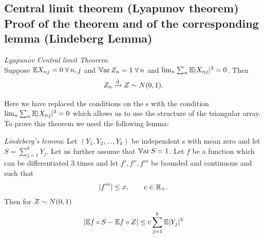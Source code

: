 \documentclass{report}
\begin{document}
\subsection{Central limit theorem (Lyapunov theorem) Proof of the theorem and of the corresponding lemma (Lindeberg Lemma)}
\begin{theorem}
	\emph{Lyapunov Central limit Theorem}:\\
	Suppose $\mathbb{E} X_{nj}=0\;\forall\, n,j$ and $\mathbb{V}\mathrm{ar}\, Z_{n}=1\;\forall\, n$ and $\lim_{n}\sum_n\mathbb{E}|X_{nj}|^{3}=0$. Then
	\[Z_{n}\xrightarrow[]{\text{d}} Z\sim N(0,1).\]
\end{theorem}
Here we have replaced the conditions on the \rv s with the condition $\lim_{n}\sum_n\mathbb{E}|X_{nj}|^{3}=0$ which allows us to use the structure of the triangular array. To prove this theorem we need the following lemma:
\begin{lemma}
	\emph{Lindeberg's lemma}:
	Let $(Y_1,Y_2,\ldots,Y_k)$ be independent \rv s with mean zero and let $S=\sum_{j=1}^{k}Y_{j}$. Let us further assume that $\mathbb{V}\mathrm{ar}\, S=1$. Let $f$ be a function which can be differentiated 3 times and let 
	$f',f'',f'''$ be bounded and continuous and such that
	\[|f'''|\leq x,\qquad c\in\mathbb{R}_+.\]
	Then for $Z\sim N(0,1)$
	\[|\mathbb{E} f\circ S-\mathbb{E} f\circ Z|\leq c\sum_{j=1}^{k}\mathbb{E}|Y_{j}|^{3}\]
\end{lemma}
\end{document}
